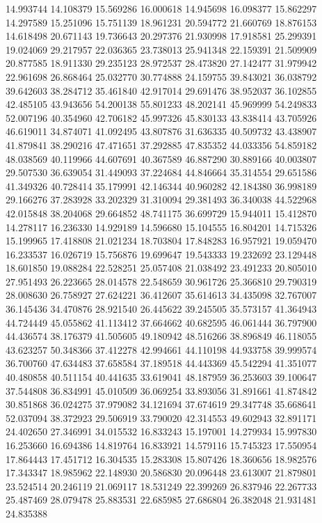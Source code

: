14.993744
14.108379
15.569286
16.000618
14.945698
16.098377
15.862297
14.297589
15.251096
15.751139
18.961231
20.594772
21.660769
18.876153
14.618498
20.671143
19.736643
20.297376
21.930998
17.918581
25.299391
19.024069
29.217957
22.036365
23.738013
25.941348
22.159391
21.509909
20.877585
18.911330
29.235123
28.972537
28.473820
27.142477
31.979942
22.961698
26.868464
25.032770
30.774888
24.159755
39.843021
36.038792
39.642603
38.284712
35.461840
42.917014
29.691476
38.952037
36.102855
42.485105
43.943656
54.200138
55.801233
48.202141
45.969999
54.249833
52.007196
40.354960
42.706182
45.997326
45.830133
43.838414
43.705926
46.619011
34.874071
41.092495
43.807876
31.636335
40.509732
43.438907
41.879841
38.290216
47.471651
37.292885
47.835352
44.033356
54.859182
48.038569
40.119966
44.607691
40.367589
46.887290
30.889166
40.003807
29.507530
36.639054
31.449093
37.224684
44.846664
35.314554
29.651586
41.349326
40.728414
35.179991
42.146344
40.960282
42.184380
36.998189
29.166276
37.283928
33.202329
31.310094
29.381493
36.340038
44.522968
42.015848
38.204068
29.664852
48.741175
36.699729
15.944011
15.412870
14.278117
16.236330
14.929189
14.596680
15.104555
16.804201
14.715326
15.199965
17.418808
21.021234
18.703804
17.848283
16.957921
19.059470
16.233537
16.026719
15.756876
19.699647
19.543333
19.232692
23.129448
18.601850
19.088284
22.528251
25.057408
21.038492
23.491233
20.805010
27.951493
26.223665
28.014578
22.548659
30.961726
25.366810
29.790319
28.008630
26.758927
27.624221
36.412607
35.614613
34.435098
32.767007
36.145436
34.470876
28.921540
26.445622
39.245505
35.573157
41.364943
44.724449
45.055862
41.113412
37.664662
40.682595
46.061444
36.797900
44.436574
38.176379
41.505605
49.180942
48.516266
38.896849
46.118055
43.623257
50.348366
37.412278
42.994661
44.110198
44.933758
39.999574
36.700760
47.634483
37.658584
37.189518
44.443369
45.542294
41.351077
40.480858
40.511154
40.441635
33.619041
48.187959
36.253603
39.100647
37.544808
36.834991
45.010509
36.069254
33.893056
31.891661
41.874842
30.851868
36.024275
37.979082
34.121694
37.674619
29.347748
35.668641
52.037094
38.372923
29.506919
33.790020
42.314553
49.602943
32.891171
24.402650
27.346991
34.015532
16.833243
15.197001
14.279934
15.997830
16.253660
16.694386
14.819764
16.833921
14.579116
15.745323
17.550954
17.864443
17.451712
16.304535
15.283308
15.807426
18.360656
18.982576
17.343347
18.985962
22.148930
20.586830
20.096448
23.613007
21.879801
23.524514
20.246119
21.069117
18.531249
22.399269
26.837946
22.267733
25.487469
28.079478
25.883531
22.685985
27.686804
26.382048
21.931481
24.835388
